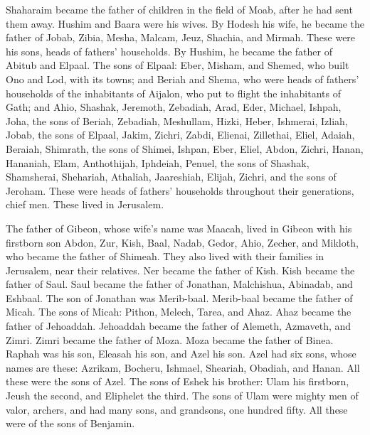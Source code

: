 \myverse{}Shaharaim became the father of children in the field of Moab, after
he had sent them away. Hushim and Baara were his wives.
\myverse{}By Hodesh his wife, he became the father of Jobab, Zibia, Mesha, Malcam,
\myverse{}Jeuz, Shachia, and Mirmah. These were his sons, heads of fathers’ households.
\myverse{}By Hushim, he became the father of Abitub and Elpaal.
\myverse{}The sons of Elpaal: Eber, Misham, and Shemed, who built Ono and Lod, with
its towns;
\myverse{}and Beriah and Shema, who were heads of fathers’ households of the inhabitants
of Aijalon, who put to flight the inhabitants of Gath;
\myverse{}and Ahio, Shashak, Jeremoth,
\myverse{}Zebadiah, Arad, Eder,
\myverse{}Michael, Ishpah, Joha, the sons of Beriah,
\myverse{}Zebadiah, Meshullam, Hizki, Heber,
\myverse{}Ishmerai, Izliah, Jobab, the sons of Elpaal,
\myverse{}Jakim, Zichri, Zabdi,
\myverse{}Elienai, Zillethai, Eliel,
\myverse{}Adaiah, Beraiah, Shimrath, the sons of Shimei,
\myverse{}Ishpan, Eber, Eliel,
\myverse{}Abdon, Zichri, Hanan,
\myverse{}Hananiah, Elam, Anthothijah,
\myverse{}Iphdeiah, Penuel, the sons of Shashak,
\myverse{}Shamsherai, Shehariah, Athaliah,
\myverse{}Jaareshiah, Elijah, Zichri, and the sons of Jeroham.
\myverse{}These were heads of fathers’ households throughout their generations, chief
men. These lived in Jerusalem.

\myverse{}The father of Gibeon, whose wife’s name was Maacah, lived in
Gibeon
\myverse{}with his firstborn son Abdon, Zur, Kish, Baal, Nadab,
\myverse{}Gedor, Ahio, Zecher,
\myverse{}and Mikloth, who became the father of Shimeah. They also lived with their
families in Jerusalem, near their relatives.
\myverse{}Ner became the father of Kish. Kish became the father of Saul. Saul became
the father of Jonathan, Malchishua, Abinadab, and Eshbaal.
\myverse{}The son of Jonathan was Merib-baal. Merib-baal became the father of Micah.
\myverse{}The sons of Micah: Pithon, Melech, Tarea, and Ahaz.
\myverse{}Ahaz became the father of Jehoaddah. Jehoaddah became the father of Alemeth,
Azmaveth, and Zimri. Zimri became the father of Moza.
\myverse{}Moza became the father of Binea. Raphah was his son, Eleasah his son, and
Azel his son.
\myverse{}Azel had six sons, whose names are these: Azrikam, Bocheru, Ishmael, Sheariah,
Obadiah, and Hanan. All these were the sons of Azel.
\myverse{}The sons of Eshek his brother: Ulam his firstborn, Jeush the second, and Eliphelet
the third.
\myverse{}The sons of Ulam were mighty men of valor, archers, and had many sons, and
grandsons, one hundred fifty. All these were of the sons of Benjamin.


